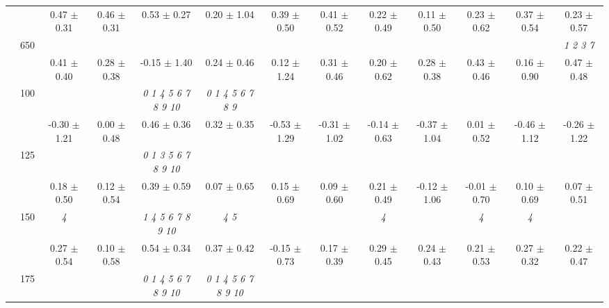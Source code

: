 \begin{table}[h]
{\begin{tabular}{
        ccccccccccccc}
 & & \cellcolor[HTML]{EFEFEF} 0.47 $\pm$ 0.31& \cellcolor[HTML]{EFEFEF} 0.46 $\pm$ 0.31& \cellcolor[HTML]{EFEFEF} 0.53 $\pm$ 0.27& \cellcolor[HTML]{EFEFEF} 0.20 $\pm$ 1.04& \cellcolor[HTML]{EFEFEF} 0.39 $\pm$ 0.50& \cellcolor[HTML]{EFEFEF} 0.41 $\pm$ 0.52& \cellcolor[HTML]{EFEFEF} 0.22 $\pm$ 0.49& \cellcolor[HTML]{EFEFEF} 0.11 $\pm$ 0.50& \cellcolor[HTML]{EFEFEF} 0.23 $\pm$ 0.62& \cellcolor[HTML]{EFEFEF} 0.37 $\pm$ 0.54& \cellcolor[HTML]{EFEFEF} 0.23 $\pm$ 0.57 \\ 
 & \multirow{2}{*}{650}& & & & & & & & & & & \textit{ 1 2 3 7 } \\ 
 & & 0.41 $\pm$ 0.40& 0.28 $\pm$ 0.38& -0.15 $\pm$ 1.40& 0.24 $\pm$ 0.46& 0.12 $\pm$ 1.24& 0.31 $\pm$ 0.46& 0.20 $\pm$ 0.62& 0.28 $\pm$ 0.38& 0.43 $\pm$ 0.46& 0.16 $\pm$ 0.90& 0.47 $\pm$ 0.48 \\ \midrule 
 & \multirow{2}{*}{100}& & & \textit{  0  1  4  5  6  7  8  9 10 }& \textit{ 0 1 4 5 6 7 8 9 }& & & & & & &  \\ 
 & & -0.30 $\pm$ 1.21& 0.00 $\pm$ 0.48& 0.46 $\pm$ 0.36& 0.32 $\pm$ 0.35& -0.53 $\pm$ 1.29& -0.31 $\pm$ 1.02& -0.14 $\pm$ 0.63& -0.37 $\pm$ 1.04& 0.01 $\pm$ 0.52& -0.46 $\pm$ 1.12& -0.26 $\pm$ 1.22 \\ 
 & \multirow{2}{*}{125}& \cellcolor[HTML]{EFEFEF} & \cellcolor[HTML]{EFEFEF} & \cellcolor[HTML]{EFEFEF} \textit{  0  1  3  5  6  7  8  9 10 }& \cellcolor[HTML]{EFEFEF} & \cellcolor[HTML]{EFEFEF} & \cellcolor[HTML]{EFEFEF} & \cellcolor[HTML]{EFEFEF} & \cellcolor[HTML]{EFEFEF} & \cellcolor[HTML]{EFEFEF} & \cellcolor[HTML]{EFEFEF} & \cellcolor[HTML]{EFEFEF}  \\ 
 & & \cellcolor[HTML]{EFEFEF} 0.18 $\pm$ 0.50& \cellcolor[HTML]{EFEFEF} 0.12 $\pm$ 0.54& \cellcolor[HTML]{EFEFEF} 0.39 $\pm$ 0.59& \cellcolor[HTML]{EFEFEF} 0.07 $\pm$ 0.65& \cellcolor[HTML]{EFEFEF} 0.15 $\pm$ 0.69& \cellcolor[HTML]{EFEFEF} 0.09 $\pm$ 0.60& \cellcolor[HTML]{EFEFEF} 0.21 $\pm$ 0.49& \cellcolor[HTML]{EFEFEF} -0.12 $\pm$ 1.06& \cellcolor[HTML]{EFEFEF} -0.01 $\pm$ 0.70& \cellcolor[HTML]{EFEFEF} 0.10 $\pm$ 0.69& \cellcolor[HTML]{EFEFEF} 0.07 $\pm$ 0.51 \\ 
 & \multirow{2}{*}{150}& \textit{ 4 }& & \textit{  1  4  5  6  7  8  9 10 }& \textit{ 4 5 }& & & \textit{ 4 }& & \textit{ 4 }& \textit{ 4 }&  \\ 
 & & 0.27 $\pm$ 0.54& 0.10 $\pm$ 0.58& 0.54 $\pm$ 0.34& 0.37 $\pm$ 0.42& -0.15 $\pm$ 0.73& 0.17 $\pm$ 0.39& 0.29 $\pm$ 0.45& 0.24 $\pm$ 0.43& 0.21 $\pm$ 0.53& 0.27 $\pm$ 0.32& 0.22 $\pm$ 0.47 \\ 
 & \multirow{2}{*}{175}& \cellcolor[HTML]{EFEFEF} & \cellcolor[HTML]{EFEFEF} & \cellcolor[HTML]{EFEFEF} \textit{  0  1  4  5  6  7  8  9 10 }& \cellcolor[HTML]{EFEFEF} \textit{  0  1  4  5  6  7  8  9 10 }& \cellcolor[HTML]{EFEFEF} & \cellcolor[HTML]{EFEFEF} & \cellcolor[HTML]{EFEFEF} & \cellcolor[HTML]{EFEFEF} & \cellcolor[HTML]{EFEFEF} & \cellcolor[HTML]{EFEFEF} & \cellcolor[HTML]{EFEFEF}  \\ 

\end{tabular}}
\end{table}
